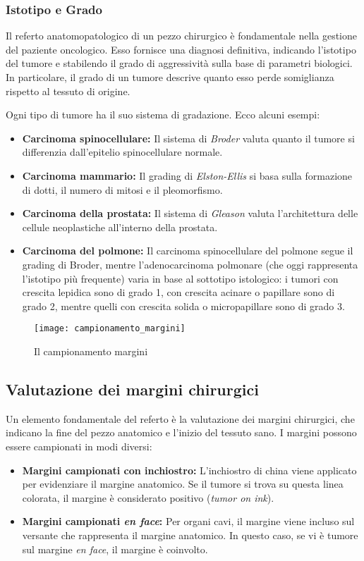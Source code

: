 \subsubsection{Istotipo e Grado}
Il referto anatomopatologico di un pezzo chirurgico è fondamentale nella gestione del paziente oncologico. Esso fornisce una diagnosi definitiva, indicando l’istotipo del tumore e stabilendo il grado di aggressività sulla base di parametri biologici. In particolare, il grado di un tumore descrive quanto esso perde somiglianza rispetto al tessuto di origine.

Ogni tipo di tumore ha il suo sistema di gradazione. Ecco alcuni esempi:
\begin{itemize}
    \item \textbf{Carcinoma spinocellulare:} Il sistema di \textit{Broder} valuta quanto il tumore si differenzia dall'epitelio spinocellulare normale.
    \item \textbf{Carcinoma mammario:} Il grading di \textit{Elston-Ellis} si basa sulla formazione di dotti, il numero di mitosi e il pleomorfismo.
    \item \textbf{Carcinoma della prostata:} Il sistema di \textit{Gleason} valuta l'architettura delle cellule neoplastiche all'interno della prostata.
    \item \textbf{Carcinoma del polmone:} Il carcinoma spinocellulare del polmone segue il grading di Broder, mentre  l'adenocarcinoma polmonare (che oggi rappresenta l'istotipo più frequente) varia in base al sottotipo istologico: i tumori con crescita lepidica sono di grado 1, con crescita acinare o papillare sono di grado 2, mentre quelli con crescita solida o micropapillare sono di grado 3.
\end{itemize}

\begin{figure}[h]
    \centering
    \texttt{[image: campionamento\_margini]}
    \caption{Il campionamento margini}
    \label{fig:campionamento_margini}
\end{figure}

\subsection{Valutazione dei margini chirurgici}
Un elemento fondamentale del referto è la valutazione dei margini chirurgici, che indicano la fine del pezzo anatomico e l'inizio del tessuto sano. I margini possono essere campionati in modi diversi:
\begin{itemize}
    \item \textbf{Margini campionati con inchiostro:} L'inchiostro di china viene applicato per evidenziare il margine anatomico. Se il tumore si trova su questa linea colorata, il margine è considerato positivo (\textit{tumor on ink}).
    \item \textbf{Margini campionati \textit{en face}:} Per organi cavi, il margine viene incluso sul versante che rappresenta il margine anatomico. In questo caso, se vi è tumore sul margine \textit{en face}, il margine è coinvolto.
\end{itemize}

